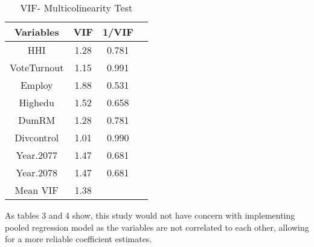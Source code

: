 \begin{table}[ht]
\centering
\begin{tabular}{cccc}

     Variables & VIF & 1/VIF \\ 
     \hline
HHI & 1.28 &0.781    \\ 
VoteTurnout & 1.15& 0.991  \\ 
Employ & 1.88 & 0.531\\
Highedu & 1.52 & 0.658  \\ 
DumRM &1.28 & 0.781 \\ 
Divcontrol &1.01 & 0.990 \\ 
Year.2077 & 1.47& 0.681 \\
Year.2078 & 1.47 & 0.681\\
\hline
Mean VIF & 1.38 & \\
\end{tabular}
\caption{VIF- Multicolinearity Test}
\label{VIF- Multicolinearity Test}
\end{table}
As tables 3 and 4 show, this study would not have concern with implementing pooled regression model as the variables are not correlated to each other, allowing for a more reliable coefficient estimates.
\
